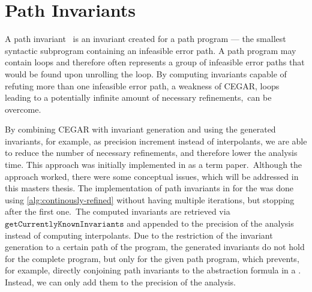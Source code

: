 \section{Path Invariants}\label{background:pathinvariants}
A path invariant~\cite{Beyer:PathInvariants} is an invariant created for a path program --- the smallest syntactic subprogram containing an infeasible error path.
A path program may contain loops and therefore often represents a group of infeasible error paths that would be found upon unrolling the loop. By computing
invariants capable of refuting more than one infeasible error path, a weakness of \ac{CEGAR}, loops leading to a potentially infinite amount of necessary
refinements,\, can be overcome.

By combining \ac{CEGAR} with invariant generation and using the generated invariants, for example, as precision increment instead of interpolants, we are able
to reduce the number of necessary refinements, and therefore lower the analysis time. This approach was initially implemented in \CPAchecker{} as a
term paper.\, Although the approach worked, there were some conceptual
issues, which will be addressed in this masters thesis. The implementation of path invariants in \CPAchecker{} for the \PredicateCPA{} was done using
\autoref{alg:continously-refined} without having multiple iterations, but stopping after the first one.\, The computed
invariants are retrieved via $\mathtt{getCurrentlyKnownInvariants}$ and appended to the precision of the analysis instead of
computing interpolants. Due to the restriction of the invariant generation to a certain path of the program, the generated invariants do not hold for
the complete program, but only for the given path program, which prevents, for example, directly conjoining path invariants to the
abstraction formula in a \PredicateCPA{}. Instead, we can only add them to the precision of the analysis.

